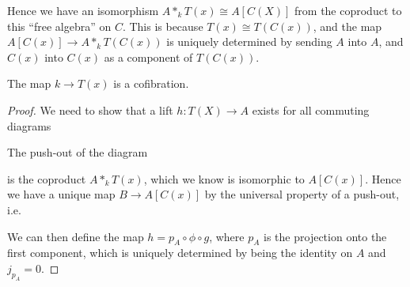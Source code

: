 Hence we have an isomorphism $A\ast_k T(x) \cong A[C(X)]$ from the coproduct to this ``free algebra'' on $C$. This is because $T(x)\cong T(C(x))$, and the map $A[C(x)]\rightarrow A\ast_k T(C(x))$ is uniquely determined by sending $A$ into $A$, and $C(x)$ into $C(x)$ as a component of $T(C(x))$. 


\begin{lemma}
The map $k\longrightarrow T(x)$ is a cofibration. 
\end{lemma}
\begin{proof}
    We need to show that a lift $h:T(X)\longrightarrow A$ exists for all commuting diagrams
\begin{center}
\end{center}
    
The push-out of the diagram 
\begin{center}
\end{center}
is the coproduct $A\ast_k T(x)$, which we know is isomorphic to $A[C(x)]$. Hence we have a unique map $B\longrightarrow A[C(x)]$ by the universal property of a push-out, i.e. 
\begin{center}
\end{center}
We can then define the map $h = p_A \circ \phi \circ g$, where $p_A$ is the projection onto the first component, which is uniquely determined by being the identity on $A$ and $j_{p_A} = 0$. 
    

\end{proof}
